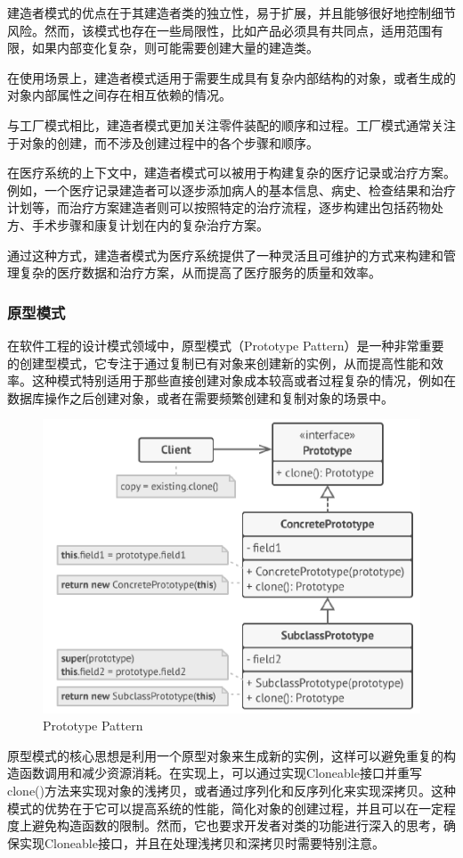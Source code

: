 建造者模式的优点在于其建造者类的独立性，易于扩展，并且能够很好地控制细节风险。然而，该模式也存在一些局限性，比如产品必须具有共同点，适用范围有限，如果内部变化复杂，则可能需要创建大量的建造类。

在使用场景上，建造者模式适用于需要生成具有复杂内部结构的对象，或者生成的对象内部属性之间存在相互依赖的情况。

与工厂模式相比，建造者模式更加关注零件装配的顺序和过程。工厂模式通常关注于对象的创建，而不涉及创建过程中的各个步骤和顺序。

在医疗系统的上下文中，建造者模式可以被用于构建复杂的医疗记录或治疗方案。例如，一个医疗记录建造者可以逐步添加病人的基本信息、病史、检查结果和治疗计划等，而治疗方案建造者则可以按照特定的治疗流程，逐步构建出包括药物处方、手术步骤和康复计划在内的复杂治疗方案。

通过这种方式，建造者模式为医疗系统提供了一种灵活且可维护的方式来构建和管理复杂的医疗数据和治疗方案，从而提高了医疗服务的质量和效率。

\subsubsection{原型模式}

在软件工程的设计模式领域中，原型模式（Prototype Pattern）是一种非常重要的创建型模式，它专注于通过复制已有对象来创建新的实例，从而提高性能和效率。这种模式特别适用于那些直接创建对象成本较高或者过程复杂的情况，例如在数据库操作之后创建对象，或者在需要频繁创建和复制对象的场景中。
\begin{figure}[htbp]
	\centering
	\includegraphics[width=0.5\textheight]{figures/04.png}
	\caption{Prototype Pattern}
\end{figure}
原型模式的核心思想是利用一个原型对象来生成新的实例，这样可以避免重复的构造函数调用和减少资源消耗。在实现上，可以通过实现Cloneable接口并重写clone()方法来实现对象的浅拷贝，或者通过序列化和反序列化来实现深拷贝。这种模式的优势在于它可以提高系统的性能，简化对象的创建过程，并且可以在一定程度上避免构造函数的限制。然而，它也要求开发者对类的功能进行深入的思考，确保实现Cloneable接口，并且在处理浅拷贝和深拷贝时需要特别注意。

